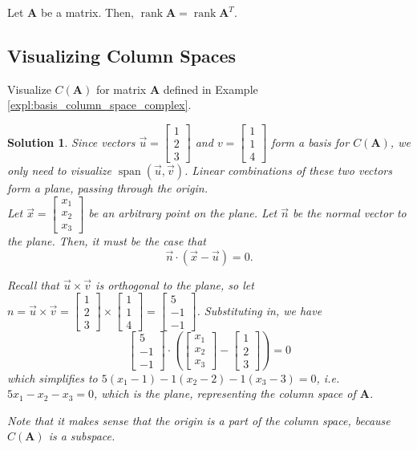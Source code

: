 \documentclass[]{book}
\DeclareMathOperator{\vecspan}{span}
\DeclareMathOperator{\rank}{rank}
\newcommand{\vecxxx}[1][x]{\ensuremath{\begin{bmatrix}
#1_1 \\
#1_2 \\
#1_3
\end{bmatrix}}}
\newcommand{\mat}[1]{\ensuremath{\mathbf{#1}}}
\newtheorem*{solution}{Solution}
\begin{document}
\begin{theorem}
    \label{thm: rank of matrices and their transposes}
    Let $\mat{A}$ be a matrix. Then, $\rank\mat{A} = \rank\mat{A}^T$.
\end{theorem}

\subsection{Visualizing Column Spaces}
\begin{example}
    \label{expl:visualizing column spaces}
    Visualize $C(\mat{A})$ for matrix $\mat{A}$ defined in Example \ref{expl:basis_column_space_complex}.
\begin{solution}
    Since vectors $\vec{u}=\begin{bmatrix}1 \\2\\3\end{bmatrix}$ and $v=\begin{bmatrix}1\\1\\4\end{bmatrix}$ form a basis for $C(\mat{A})$, we only need to visualize $\vecspan(\vec{u},\vec{v})$. Linear combinations of these two vectors form a plane, passing through the origin. \\
    Let $\vec{x}=\vecxxx$ be an arbitrary point on the plane. Let $\vec{n}$ be the normal vector to the plane. Then, it must be the case that
    \[\vec{n} \cdot \left(\vec{x} - \vec{u}\right) = 0.\]
    
    Recall that $\vec{u} \times \vec{v}$ is orthogonal to the plane, so let $n=\vec{u} \times \vec{v} = \begin{bmatrix}1 \\2\\3\end{bmatrix} \times \begin{bmatrix}1\\1\\4\end{bmatrix} = \begin{bmatrix}5 \\ -1 \\ -1\end{bmatrix}$. Substituting in, we have
    \[\begin{bmatrix}5 \\ -1 \\ -1\end{bmatrix} \cdot \left(\vecxxx - \begin{bmatrix}1 \\2\\3\end{bmatrix}\right) = 0\]
    which simplifies to $5(x_1-1)-1(x_2-2)-1(x_3-3)=0$, i.e. $5x_1-x_2-x_3=0$, which is the plane, representing the column space of $\mat{A}$.

    Note that it makes sense that the origin is a part of the column space, because $C(\mat{A})$ is a subspace. \hfill \qedsymbol
\end{solution}
\end{example}
\end{document}
